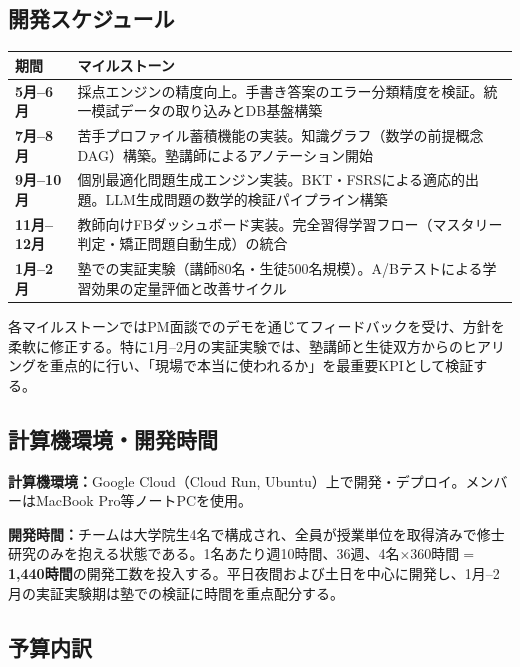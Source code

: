 \documentclass[paper=a4,fontsize=10.5bp,jafontsize=10.5bp,twocolumn]{jlreq}
\begin{document}
\subsection{開発スケジュール}

\begin{scriptsize}\noindent
\begin{tabularx}{\linewidth}{>{\bfseries}l X}
\toprule
期間 & マイルストーン \\
\midrule
5月--6月 & 採点エンジンの精度向上。手書き答案のエラー分類精度を検証。統一模試データの取り込みとDB基盤構築 \\
7月--8月 & 苦手プロファイル蓄積機能の実装。知識グラフ（数学の前提概念DAG）構築。塾講師によるアノテーション開始 \\
9月--10月 & 個別最適化問題生成エンジン実装。BKT・FSRSによる適応的出題。LLM生成問題の数学的検証パイプライン構築 \\
11月--12月 & 教師向けFBダッシュボード実装。完全習得学習フロー（マスタリー判定・矯正問題自動生成）の統合 \\
1月--2月 & 塾での実証実験（講師80名・生徒500名規模）。A/Bテストによる学習効果の定量評価と改善サイクル \\
\bottomrule
\end{tabularx}
\end{scriptsize}

\noindent
各マイルストーンではPM面談でのデモを通じてフィードバックを受け、方針を柔軟に修正する。特に1月--2月の実証実験では、塾講師と生徒双方からのヒアリングを重点的に行い、「現場で本当に使われるか」を最重要KPIとして検証する。

\subsection{計算機環境・開発時間}

\noindent\textbf{計算機環境：}Google Cloud（Cloud Run, Ubuntu）上で開発・デプロイ。メンバーはMacBook Pro等ノートPCを使用。

\noindent\textbf{開発時間：}チームは大学院生4名で構成され、全員が授業単位を取得済みで修士研究のみを抱える状態である。1名あたり週10時間、36週、4名$\times$360時間$=$\textbf{1,440時間}の開発工数を投入する。平日夜間および土日を中心に開発し、1月--2月の実証実験期は塾での検証に時間を重点配分する。

\subsection{予算内訳}
\end{document}
